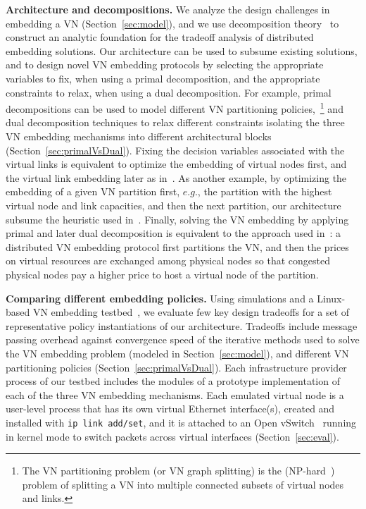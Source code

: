 \documentclass[a4paper, 10pt, conference]{ieeeconf}
\begin{document}
\noindent
{\bf Architecture and decompositions.}  We analyze the design challenges in embedding a  VN (Section~\ref{sec:model}), and we use decomposition theory~\cite{boyd-book} to construct an analytic foundation for the tradeoff analysis of distributed embedding solutions. 
Our architecture can be used to subsume existing solutions, and to design novel VN embedding protocols by selecting the appropriate variables to fix, when using a primal decomposition, and the appropriate constraints to relax, when using a dual decomposition. 
 For example, primal decompositions can be used to model different VN partitioning policies,~\footnote{The VN partitioning problem (or VN graph splitting) is the (NP-hard~\cite{Houidi2011}) problem of splitting a VN into multiple connected subsets of virtual nodes and links.} and  dual decomposition techniques to relax different constraints isolating the three VN embedding mechanisms into different architectural blocks (Section~\ref{sec:primalVsDual}). Fixing the decision variables associated with the virtual links is equivalent to optimize the embedding of virtual nodes first, and the virtual link embedding later as in~\cite{pathsplitting}.
As another example, by optimizing the embedding of a given VN partition first, $e.g.$, the partition with the highest virtual node and link capacities, and then the next partition, our architecture subsume the heuristic used in~\cite{Houidi-distributedVNM}. 
Finally, solving the VN embedding by applying primal and later dual decomposition is equivalent to the approach used in~\cite{CAD}: a distributed VN embedding protocol first partitions the VN, and then the prices on virtual resources are exchanged among physical nodes so that congested physical nodes pay a higher price to host a virtual node of the partition.


\noindent
 {\bf Comparing different embedding policies.} Using simulations and a Linux-based VN embedding testbed~\cite{myPhDThesisTR}, we evaluate few key design tradeoffs for a set of representative policy instantiations of our architecture.
Tradeoffs include message passing overhead against convergence speed of the iterative methods used to solve the VN embedding problem (modeled in Section~\ref{sec:model}), and different VN partitioning policies  (Section~\ref{sec:primalVsDual}). 
Each infrastructure provider process of our testbed includes the modules of a prototype implementation of each of the three VN embedding mechanisms.
Each emulated virtual node is a user-level process that has its own virtual Ethernet interface(s), created and installed with {\tt ip link add/set}, and it is attached to an Open vSwitch~\cite{openvswitch} running in kernel mode to switch packets across virtual interfaces (Section~\ref{sec:eval}). 
\end{document}
